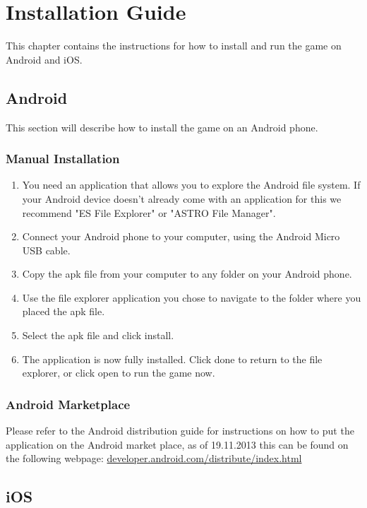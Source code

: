 \chapter{Installation Guide}

This chapter contains the instructions for how to install and run the game on 
Android and iOS.

\section{Android}

This section will describe how to install the game on an Android phone.

\subsection*{Manual Installation}
\begin{enumerate}

	\item{} You need an application that allows you to explore the Android file
	system. If your Android device doesn't already come with an application for
	this we recommend "ES File Explorer" or "ASTRO File Manager".

	\item{} Connect your Android phone to your computer, using the Android Micro
	USB cable.

	\item{} Copy the apk file from your computer to any folder on your Android 
	phone.

	\item{} Use the file explorer application you chose to navigate to the folder 
	where you placed the apk file.

	\item{} Select the apk file and click install.

	\item{} The application is now fully installed. Click done to return to the 
	file explorer, or click open to run the game now.

\end{enumerate}

\subsection*{Android Marketplace}
Please refer to the Android distribution guide for instructions on how to put 
the application on the Android market place, as of 19.11.2013 this can be found 
on the following webpage: \href{http://developer.android.com/distribute/index.h //
tml}{developer.android.com/distribute/index.html}

\section{iOS}
